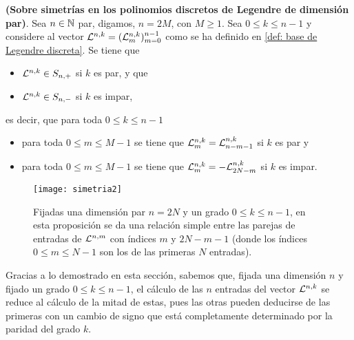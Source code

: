 \begin{teo}
\label{prop: simetrias en dimensiones pares}
\textbf{(Sobre simetrías
en los polinomios discretos de Legendre de dimensión par)}.
Sea $n \in \mathbb{N}$ par, digamos,
$n=2M$, con $M \geq 1$. Sea $0 \leq k \leq n-1$ y
considere al vector $\mathcal{L}^{n,k}=(\mathcal{L}^{n,k}_{m})_{m=0}^{n-1}$
como se ha definido en \eqref{def: base de Legendre discreta}.
Se tiene que 
\begin{itemize}
\item $\mathcal{L}^{n,k} \in S_{n,+}$ si $k$ es par, y que
\item $\mathcal{L}^{n,k} \in S_{n,-}$ si $k$ es impar,
\end{itemize}
es decir, que para toda $0 \leq k \leq n-1$ 

\begin{itemize}
\item para toda $0 \leq m \leq M-1$ se tiene que 
$\mathcal{L}^{n,k}_{m} = \mathcal{L}^{n,k}_{n-m-1}$ si $k$ es par y
\item para toda $0 \leq m \leq M-1$ 
se tiene que $\mathcal{L}^{n,k}_{m} = -\mathcal{L}^{n,k}_{2N-m}$ si $k$ es impar.
\end{itemize}

\end{teo}
\begin{figure}[H]
\centering\captionsetup{format = hang}
	\begin{measuredfigure}
		\texttt{[image: simetria2]} 
		\caption{Fijadas una dimensión par $n=2N$ 
		y un grado $0 \leq k \leq n-1$,
		en esta proposición se da una relación simple entre las parejas 
		de entradas de $\mathcal{L}^{n,m}$ con índices $m$ y $2N-m-1$ 
		(donde los índices $0 \leq m \leq N-1$ son los de las primeras
		$N$ entradas).}
 	\end{measuredfigure}
 \end{figure}

Gracias a lo demostrado en esta sección, sabemos que,
fijada una dimensión $n$ y fijado un grado $0 \leq k \leq n-1$,
el cálculo de las $n$ entradas del vector $\mathcal{L}^{n,k}$
se reduce al cálculo de la mitad de estas, pues las otras pueden
deducirse de las primeras con un cambio de signo que está completamente
determinado por la paridad del grado $k$.